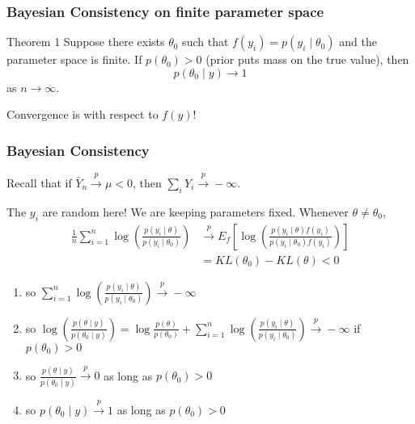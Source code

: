 \documentclass{beamer}
\begin{document}
\begin{frame}
\frametitle{Bayesian Consistency on finite parameter space}

\begin{block}{Theorem 1}
Suppose there exists $\theta_0$ such that $f(y_i) = p(y_i \mid \theta_0)$ and the parameter space is finite. If $p(\theta_0) > 0$ (prior puts mass on the true value), then
$$
p(\theta_0 \mid y) \to 1 
$$
as $n \to \infty$.
\end{block}
Convergence is with respect to $f(y)$!

\end{frame}
\begin{frame}
\frametitle{Bayesian Consistency }

Recall that if $\bar{Y}_n \overset{p}{\to} \mu < 0$, then $\sum_i Y_i \overset{p}{\to} -\infty$.
\newline

The $y_i$ are random here! We are keeping parameters fixed. Whenever $\theta \neq \theta_0$,
\begin{align*}
\frac{1}{n} \sum_{i=1}^n \log \left(\frac{p(y_i \mid \theta) }{p(y_i \mid \theta_0) } \right) &\overset{p}{\to} E_f\left[\log \left(\frac{p(y_i \mid \theta)f(y_i) }{p(y_i \mid \theta_0)f(y_i) } \right) \right] \\
&= KL(\theta_0) - KL(\theta) < 0
\end{align*}


\begin{enumerate}
\item so $\sum_{i=1}^n \log \left(\frac{p(y_i \mid \theta) }{p(y_i \mid \theta_0) } \right) \overset{p}{\to} -\infty$
\item so $\log \left(\frac{p(\theta \mid y)}{ p(\theta_0 \mid y) } \right) = \log \frac{p(\theta)}{p(\theta_0)} + \sum_{i=1}^n \log \left(\frac{p(y_i \mid \theta) }{p(y_i \mid \theta_0) } \right) \overset{p}{\to} -\infty$ if $p(\theta_0 ) > 0 $
\item so $\frac{p(\theta \mid y)}{ p(\theta_0 \mid y) }   \overset{p}{\to} 0$ as long as $p(\theta_0) > 0$
\item so $p(\theta_0 \mid y)  \overset{p}{\to} 1$ as long as $p(\theta_0) > 0$
\end{enumerate}

\end{frame}
\end{document}
